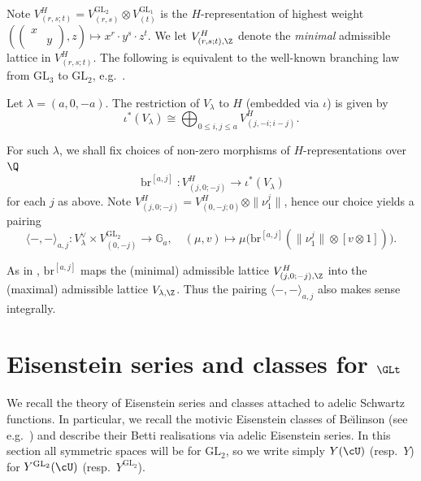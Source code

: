 \documentclass[10pt,reqno,a4paper]{amsart}
\newcommand{\stbt}[4]{\left(\begin{smallmatrix}#1 & #2\\#3&#4\end{smallmatrix}\right)}
\newcommand{\GL}{\mathrm{GL}}
\begin{document}
Note $V^H_{(r, s; t)} = V_{(r,s)}^{\GL_2} \otimes V_{(t)}^{\GL_1}$ is the $H$-representation of highest weight $(\stbt x {}{}y, z) \mapsto x^r \cdot  y^s \cdot z^t$. We let $V_{(r,s;t),\Z}^H$ denote the \emph{minimal} admissible lattice in $V_{(r,s;t)}^H$. The following is equivalent to the well-known branching law from $\GL_3$ to $\GL_2$, e.g.~\cite[\S8]{goodmanwallach}.

\begin{proposition}\label{prop:branching}
Let $\lambda = (a, 0, -a)$. The restriction of $V_\lambda$ to $H$ (embedded via $\iota$) is given by
\[
\iota^*\left(V_\lambda\right) \cong \bigoplus_{0 \le i,j \le a} V^H_{(j, -i; i-j)}.
\]
\end{proposition}

For such $\lambda$, we shall fix choices of non-zero morphisms of $H$-representations over $\Q$
\[ \operatorname{br}^{[a,j]}: V^H_{(j, 0; -j)} \to \iota^*\left(V_{\lambda}\right)\]
for each $j$ as above. Note $V^H_{(j, 0; -j)} = V^H_{(0, -j; 0)} \otimes \|\nu_1^j\|$, hence our choice yields a pairing
\begin{equation}\label{eq:branching pairing}
\langle -,-\rangle_{a,j} : V_{\lambda}^\vee \times V_{(0,-j)}^{\GL_2} \to \mathbb{G}_a,\hspace{12pt} (\mu,v) \mapsto \mu\big( \mathrm{br}^{[a,j]}(\|\nu_1^j\| \otimes [v \otimes 1])\big).
\end{equation}


As in \cite[Prop 4.3.5]{LSZ17}, $\mathrm{br}^{[a,j]}$ maps the (minimal) admissible lattice $V^H_{(j,0;-j),\Z}$ into the (maximal) admissible lattice $V_{\lambda,\Z}$. Thus the pairing $\langle-,-\rangle_{a,j}$ also makes sense integrally.



%
%

\section{Eisenstein series and classes for \texorpdfstring{$\GLt$}{GL2}}

We recall the theory of Eisenstein series and classes attached to adelic Schwartz functions. In particular, we recall the motivic Eisenstein classes of Be\u{\i}linson (see e.g.\ \cite[\S7]{LSZ17}) and describe their Betti realisations via adelic Eisenstein series. In this section all symmetric spaces will be for $\GL_2$, so we write simply $Y(\cU)$ (resp.\ $Y$) for $Y^{\GL_2}(\cU)$ (resp.\ $Y^{\GL_2}$).
\end{document}
